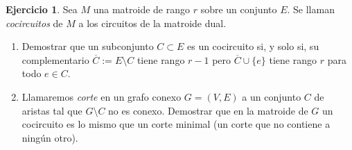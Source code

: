 \documentclass[10pt]{article}
\theoremstyle{definition}
\newtheorem{ejer}{Ejercicio}
\begin{document}
\begin{ejer} Sea $M$ una matroide de rango $r$ sobre un conjunto $E$. Se llaman \textit{cocircuitos} de $M$ a los circuitos de la matroide dual.
\begin{enumerate}
\item Demostrar que un subconjunto $C\subset E$ es un cocircuito si, y solo si, su complementario $\overline{C}:=E\setminus C$ tiene rango $r-1$ pero $\overline{C}\cup \{e\}$ tiene rango $r$ para todo $e\in C$.
\item Llamaremos \textit{corte} en un grafo conexo $G=(V,E)$ a un conjunto $C$ de aristas tal que $G\setminus C$ no es conexo. Demostrar que en la matroide de $G$ un cocircuito es lo mismo que un corte minimal (un corte que no contiene a ningún otro).
\end{enumerate}
\end{ejer}
\end{document}
